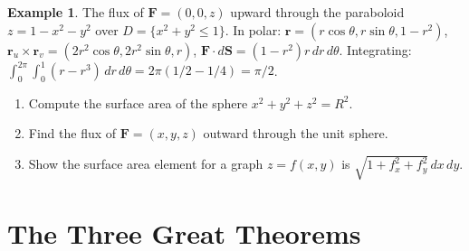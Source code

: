 \documentclass[12pt, openany]{book}
\theoremstyle{plain}
\theoremstyle{definition}
\newtheorem{example}[theorem]{Example}
\theoremstyle{remark}
\begin{document}
\begin{example}
The flux of $\mathbf{F}=(0,0,z)$ upward through the paraboloid $z=1-x^2-y^2$
over $D=\{x^2+y^2\leq 1\}$.  In polar: $\mathbf{r}=(r\cos\theta,r\sin\theta,1-r^2)$,
$\mathbf{r}_u\times\mathbf{r}_v=(2r^2\cos\theta,2r^2\sin\theta,r)$,
$\mathbf{F}\cdot d\mathbf{S}=(1-r^2)r\,dr\,d\theta$.
Integrating: $\int_0^{2\pi}\!\!\int_0^1 (r-r^3)\,dr\,d\theta
=2\pi(1/2-1/4)=\pi/2$.
\end{example}

\begin{exbox}
\begin{enumerate}
  \item Compute the surface area of the sphere $x^2+y^2+z^2=R^2$.
  \item Find the flux of $\mathbf{F}=(x,y,z)$ outward through the unit sphere.
  \item Show the surface area element for a graph $z=f(x,y)$ is
        $\sqrt{1+f_x^2+f_y^2}\,dx\,dy$.
\end{enumerate}
\end{exbox}
\color{black}

\chapter{The Three Great Theorems}
\color{black}
\end{document}
